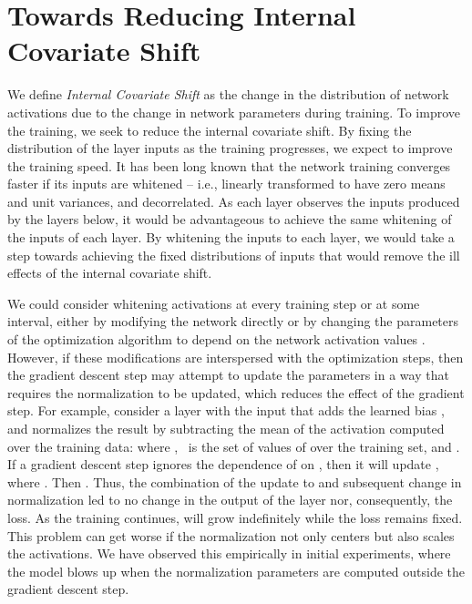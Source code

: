 \documentclass[twocolumn]{article}
\begin{document}
\section{Towards Reducing Internal \mbox{Covariate} Shift}

We define {\em Internal Covariate Shift} as
the change in the
distribution of network activations due to the change in network parameters during training.  To improve the
training, we seek to reduce the internal covariate shift.  By fixing
the distribution of the layer inputs  as the training progresses,
we expect to improve the training speed.
It has been long known \cite{lecun-backprop,
  loglinear-training}
that the network training converges faster if its inputs are whitened -- i.e.,
linearly transformed to have zero means and unit variances, and  decorrelated. As each layer
observes the inputs produced by the layers below, it would be advantageous to
achieve the same whitening of the inputs of each layer.  By whitening the
inputs to each layer, we would take a step towards achieving the fixed
distributions of inputs that would remove the ill effects of the internal covariate shift.


We could consider whitening activations at every training step or at
some interval, either by modifying the network directly or by changing
the parameters of the optimization algorithm to depend on the network
activation values \cite{mean-normalized-sgd, raiko, povey,
  desjardins}.  However, if these modifications are interspersed with
the optimization steps, then the gradient descent step may attempt to
update the parameters in a way that requires the normalization to be
updated, which reduces the effect of the gradient step. For example,
consider a layer with the input  that adds the learned bias ,
and normalizes the result by subtracting the mean of the activation
computed over the training data:  where ,
\, is the set of values of  over the
 training set, and . If  a gradient descent step ignores the dependence of   on , then it  will
update , where . Then  . Thus, the combination of the update to  and subsequent change in
normalization led to no change in the output of the layer nor,
consequently, the loss. As the training continues,  will grow
indefinitely while the loss remains fixed. This problem can get worse
if the normalization not only centers but also scales the activations.
We have observed this empirically in initial experiments, where the
model blows up when the normalization parameters are computed outside
the gradient descent step.
\end{document}
